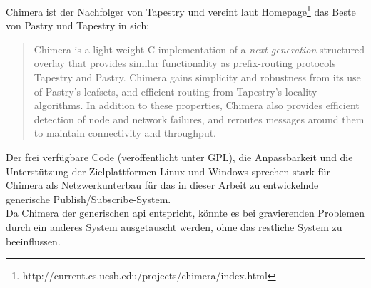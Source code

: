 Chimera \cite{Allen2006Chimera} ist der Nachfolger von Tapestry und vereint laut Homepage\footnote{http://current.cs.ucsb.edu/projects/chimera/index.html} das Beste von Pastry und Tapestry in sich: 

\begin{quote}
Chimera is a light-weight C implementation of a \emph{next-generation} structured overlay that provides similar functionality as prefix-routing protocols Tapestry and Pastry.  Chimera gains simplicity and robustness from its use of Pastry's leafsets, and efficient routing from Tapestry's locality algorithms.  In addition to these properties, Chimera also provides efficient detection of node and network failures, and reroutes messages around them to maintain connectivity and throughput.  
\end{quote}

Der frei verfügbare Code (veröffentlicht unter GPL), die Anpassbarkeit und die Unterstützung der Zielplattformen Linux und Windows sprechen stark für Chimera als Netzwerkunterbau für das in dieser Arbeit zu entwickelnde generische Publish/Subscribe-System.\\
Da Chimera der generischen \ac{api} entspricht, könnte es bei gravierenden Problemen durch ein anderes System ausgetauscht werden, ohne das restliche System zu beeinflussen.
